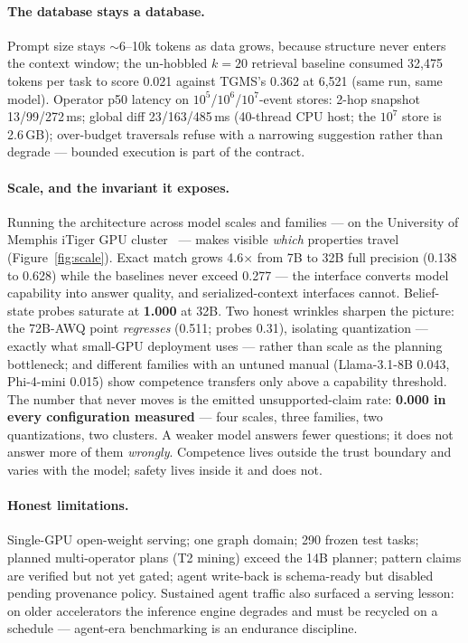 \documentclass[sigconf]{acmart}
\begin{document}
\paragraph{The database stays a database.}
Prompt size stays ${\sim}$6--10k tokens as data grows, because structure
never enters the context window; the un-hobbled $k{=}20$ retrieval
baseline consumed 32{,}475 tokens per task to score 0.021 against
TGMS's 0.362 at 6{,}521 (same run, same model). Operator p50 latency on
$10^5$/$10^6$/$10^7$-event stores: 2-hop snapshot 13/99/272\,ms; global
diff 23/163/485\,ms (40-thread CPU host; the $10^7$ store is 2.6\,GB);
over-budget traversals refuse with a narrowing suggestion rather than
degrade --- bounded execution is part of the contract.

\paragraph{Scale, and the invariant it exposes.}
Running the architecture across model scales and families --- on the
University of Memphis iTiger GPU cluster~\cite{sharif2025itiger} ---
makes visible \emph{which} properties travel
(Figure~\ref{fig:scale}). Exact match
grows 4.6$\times$ from 7B to 32B full precision (0.138 to 0.628) while
the baselines never exceed 0.277 --- the interface converts model
capability into answer quality, and serialized-context interfaces
cannot. Belief-state probes saturate at \textbf{1.000} at 32B. Two
honest wrinkles sharpen the picture: the 72B-AWQ point \emph{regresses}
(0.511; probes 0.31), isolating quantization --- exactly what small-GPU
deployment uses --- rather than scale as the planning bottleneck; and
different families with an untuned manual (Llama-3.1-8B 0.043,
Phi-4-mini 0.015) show competence transfers only above a capability
threshold. The number that never moves is the emitted unsupported-claim
rate: \textbf{0.000 in every configuration measured} --- four scales,
three families, two quantizations, two clusters. A weaker model answers
fewer questions; it does not answer more of them \emph{wrongly}.
Competence lives outside the trust boundary and varies with the model;
safety lives inside it and does not.

\paragraph{Honest limitations.}
Single-GPU open-weight serving; one graph domain; 290 frozen test tasks;
planned multi-operator plans (T2 mining) exceed the 14B planner; pattern
claims are verified but not yet gated; agent write-back is schema-ready
but disabled pending provenance policy. Sustained agent traffic also
surfaced a serving lesson: on older accelerators the inference engine
degrades and must be recycled on a schedule --- agent-era benchmarking
is an endurance discipline.
\end{document}
